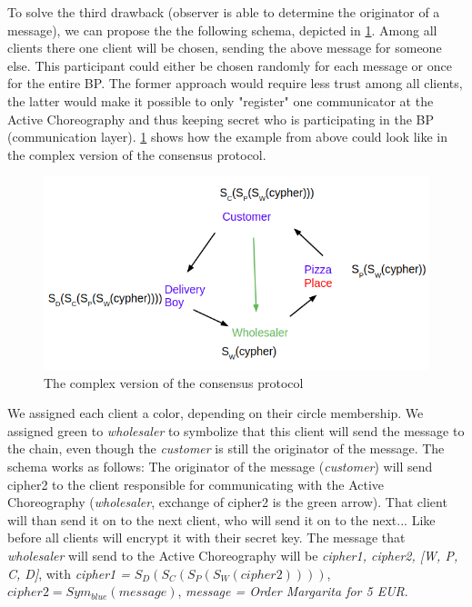 \documentclass[runningheads]{llncs}
\begin{document}
To solve the third drawback (observer is able to determine the originator of a message), we can propose the the following schema, depicted in \ref{fig:complex}. Among all clients there one client will be chosen, sending the above message for someone else. This participant could either be chosen randomly for each message or once for the entire BP. The former approach would require less trust among all clients, the latter would make it possible to only "register" one communicator at the Active Choreography and thus keeping secret who is participating in the BP (communication layer). \ref{fig:complex} shows how the example from above could look like in the complex version of the consensus protocol.

\begin{figure}
    \centering
    \includegraphics[scale=0.6]{complex.png}
    \caption{The complex version of the consensus protocol}
    \label{fig:complex}
\end{figure}


We assigned each client a color, depending on their circle membership. We assigned green to \textit{wholesaler} to symbolize that this client will send the message to the chain, even though the \textit{customer} is still the originator of the message. The schema works as follows: The originator of the message (\textit{customer}) will send cipher2 to the client responsible for communicating with the Active Choreography (\textit{wholesaler}, exchange of cipher2 is the green arrow). That client will than send it on to the next client, who will send it on to the next... Like before all clients will encrypt it with their secret key. The message that \textit{wholesaler} will send to the Active Choreography will be \textit{cipher1, cipher2, [W, P, C, D]}, with \textit{cipher1 =} $S_D(S_C(S_P(S_W(cipher2))))$, $cipher2 = Sym_{blue}(message)$, \textit{message = Order Margarita for 5 EUR}. 
\end{document}
